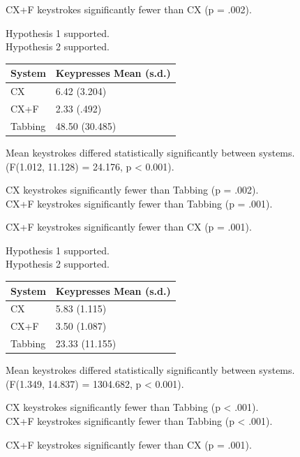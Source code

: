 \documentclass[a4paper, 12pt]{report}
\begin{document}
CX+F keystrokes significantly fewer than CX (p = .002).

Hypothesis 1 supported.\\
Hypothesis 2 supported.

\begin{tabular}{l l}
\hline\hline %
System & Keypresses Mean (s.d.) \\ [0.5ex] %
\hline %
CX & 6.42 (3.204)\\
CX+F & 2.33 (.492)\\
Tabbing & 48.50 (30.485)\\ [1ex] %
\hline %
\end{tabular}

Mean keystrokes differed statistically significantly between systems.\\
(F(1.012, 11.128) = 24.176, p < 0.001).

CX keystrokes significantly fewer than Tabbing (p = .002).\\
CX+F keystrokes significantly fewer than Tabbing (p = .001).

CX+F keystrokes significantly fewer than CX (p = .001).

Hypothesis 1 supported.\\
Hypothesis 2 supported.

\begin{tabular}{l l}
\hline\hline %
System & Keypresses Mean (s.d.) \\ [0.5ex] %
\hline %
CX & 5.83 (1.115)\\
CX+F & 3.50 (1.087)\\
Tabbing & 23.33 (11.155)\\ [1ex] %
\hline %
\end{tabular}

Mean keystrokes differed statistically significantly between systems.\\
(F(1.349, 14.837) = 1304.682, p < 0.001).

CX keystrokes significantly fewer than Tabbing (p < .001).\\
CX+F keystrokes significantly fewer than Tabbing (p < .001).

CX+F keystrokes significantly fewer than CX (p = .001).
\end{document}
